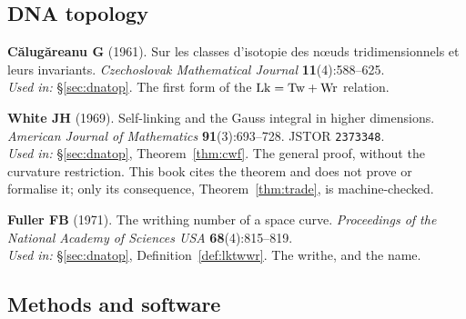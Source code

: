\subsection*{DNA topology}

\begin{refs}
\item \textbf{Călugăreanu G} (1961). Sur les classes d'isotopie des n\oe{}uds
tridimensionnels et leurs invariants. \emph{Czechoslovak Mathematical Journal}
\textbf{11}(4):588--625. 
\\[0.15em]
\emph{Used in:} §\ref{sec:dnatop}. The first form of the $\mathrm{Lk} = \mathrm{Tw} + \mathrm{Wr}$
relation.

\item \textbf{White JH} (1969). Self-linking and the Gauss integral in higher
dimensions. \emph{American Journal of Mathematics} \textbf{91}(3):693--728.
\nodoi{} JSTOR \texttt{2373348}.
\\[0.15em]
\emph{Used in:} §\ref{sec:dnatop}, Theorem~\ref{thm:cwf}. The general proof,
without the curvature restriction. This book cites the theorem and does not
prove or formalise it; only its consequence, Theorem~\ref{thm:trade}, is
machine-checked.

\item \textbf{Fuller FB} (1971). The writhing number of a space curve.
\emph{Proceedings of the National Academy of Sciences USA}
\textbf{68}(4):815--819. 
\\[0.15em]
\emph{Used in:} §\ref{sec:dnatop}, Definition~\ref{def:lktwwr}. The writhe, and
the name.
\end{refs}

\subsection*{Methods and software}

